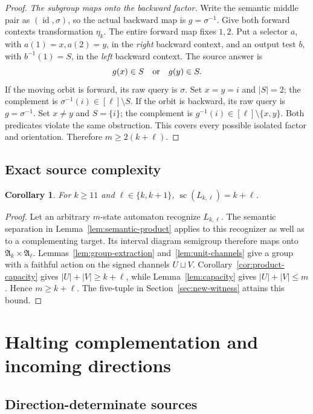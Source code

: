 \documentclass[11pt,a4paper]{article}
\newtheorem{corollary}[theorem]{Corollary}
\theoremstyle{definition}
\theoremstyle{remark}
\newcommand{\Alt}{\mathfrak A}
\newcommand{\statecomplexity}{\operatorname{sc}}
\newcommand{\id}{\operatorname{id}}
\begin{document}
\begin{proof}
\emph{The subgroup maps onto the backward factor.} Write the semantic middle pair as $(\id,\sigma)$, so the actual backward map is $g=\sigma^{-1}$. Give both forward contexts transformation $\eta_k$. The entire forward map fixes $1,2$. Put a selector $a$, with $a(1)=x,a(2)=y$, in the \emph{right} backward context, and an output test $b$, with $b^{-1}(1)=S$, in the \emph{left} backward context. The source answer is
\begin{equation}\label{eq:backward-factor}
g(x)\in S\quad\hbox{or}\quad g(y)\in S.
\end{equation}
If the moving orbit is forward, its raw query is $\sigma$. Set $x=y=i$ and $|S|=2$; the complement is $\sigma^{-1}(i)\in[\ell]\setminus S$.
If the orbit is backward, its raw query is $g=\sigma^{-1}$. Set $x\ne y$ and $S=\{i\}$; the complement is $g^{-1}(i)\in[\ell]\setminus\{x,y\}$.
Both predicates violate the same obstruction. This covers every possible isolated factor and orientation. Therefore $m\ge2(k+\ell)$.
\end{proof}


\subsection{Exact source complexity}

\begin{corollary}\label{cor:source-minimal}
For $k\ge11$ and $\ell\in\{k,k+1\}$,
$\statecomplexity(L_{k,\ell})=k+\ell$.
\end{corollary}
\begin{proof}
Let an arbitrary $m$-state automaton recognize $L_{k,\ell}$. The
semantic separation in Lemma~\ref{lem:semantic-product} applies to
this recognizer as well as to a complementing target. Its interval
diagram semigroup therefore maps onto $\Alt_k\times\Alt_\ell$.
Lemmas~\ref{lem:group-extraction} and~\ref{lem:unit-channels} give
a group with a faithful action on the signed channels $U\sqcup V$.
Corollary~\ref{cor:product-capacity} gives $|U|+|V|\ge k+\ell$,
while Lemma~\ref{lem:capacity} gives $|U|+|V|\le m$. Hence
$m\ge k+\ell$. The five-tuple in Section~\ref{sec:new-witness}
attains this bound.
\end{proof}

\section{Halting complementation and incoming directions}
\label{sec:direction-upper}

\subsection{Direction-determinate sources}
\end{document}
